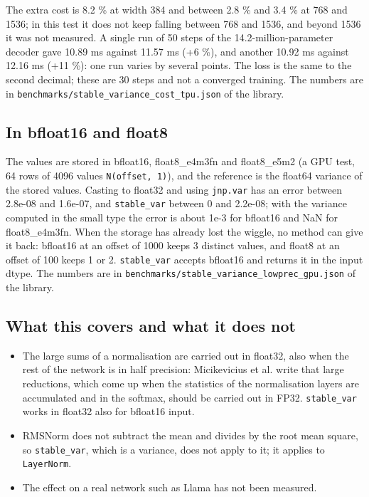 \documentclass[11pt]{article}
\begin{document}
The extra cost is 8.2 \% at width 384 and between 2.8 \% and 3.4 \% at 768 and 1536; in this test it does not keep falling between 768 and 1536, and beyond 1536 it was not measured. A single run of 50 steps of the 14.2-million-parameter decoder gave 10.89 ms against 11.57 ms (+6 \%), and another 10.92 ms against 12.16 ms (+11 \%): one run varies by several points. The loss is the same to the second decimal; these are 30 steps and not a converged training. The numbers are in \texttt{benchmarks/stable\_variance\_cost\_tpu.json} of the library.

\subsection{In bfloat16 and float8}

The values are stored in bfloat16, float8\_e4m3fn and float8\_e5m2 (a GPU test, 64 rows of 4096 values \texttt{N(offset, 1)}), and the reference is the float64 variance of the stored values. Casting to float32 and using \texttt{jnp.var} has an error between 2.8e-08 and 1.6e-07, and \texttt{stable\_var} between 0 and 2.2e-08; with the variance computed in the small type the error is about 1e-3 for bfloat16 and NaN for float8\_e4m3fn. When the storage has already lost the wiggle, no method can give it back: bfloat16 at an offset of 1000 keeps 3 distinct values, and float8 at an offset of 100 keeps 1 or 2. \texttt{stable\_var} accepts bfloat16 and returns it in the input dtype. The numbers are in \texttt{benchmarks/stable\_variance\_lowprec\_gpu.json} of the library.

\subsection{What this covers and what it does not}

\begin{itemize}
\item The large sums of a normalisation are carried out in float32, also when the rest of the network is in half precision: Micikevicius et al. \cite{micikevicius2018} write that large reductions, which come up when the statistics of the normalisation layers are accumulated and in the softmax, should be carried out in FP32. \texttt{stable\_var} works in float32 also for bfloat16 input.
\item RMSNorm \cite{zhang2019} does not subtract the mean and divides by the root mean square, so \texttt{stable\_var}, which is a variance, does not apply to it; it applies to \texttt{LayerNorm}.
\item The effect on a real network such as Llama has not been measured.
\end{itemize}
\end{document}
